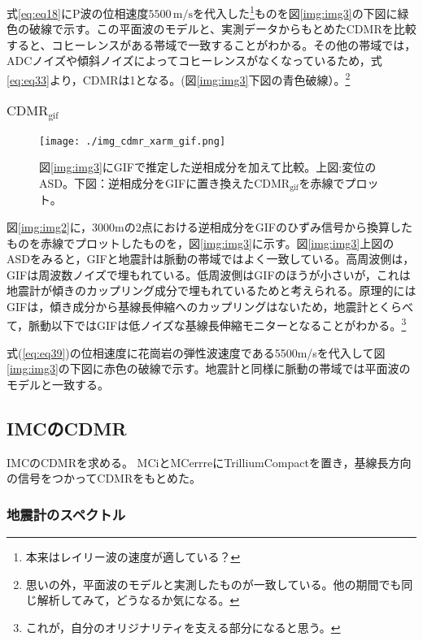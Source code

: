 式\ref{eq:eq18}にP波の位相速度$5500\, \mathrm{m/s}$を代入した\footnote[9]{本来はレイリー波の速度が適している？}ものを図\ref{img:img3}の下図に緑色の破線で示す。この平面波のモデルと、実測データからもとめたCDMRを比較すると、コヒーレンスがある帯域で一致することがわかる。その他の帯域では，ADCノイズや傾斜ノイズによってコヒーレンスがなくなっているため，式\ref{eq:eq33}より，CDMRは1となる。(図\ref{img:img3}下図の青色破線）。\footnote[10]{思いの外，平面波のモデルと実測したものが一致している。他の期間でも同じ解析してみて，どうなるか気になる。}

\subsubsection{$\mathrm{CDMR_{gif}}$}
\begin{figure}[H]
  \begin{center}
    \texttt{[image: ./img\_cdmr\_xarm\_gif.png]}
  \end{center}
  \caption{図\ref{img:img3}にGIFで推定した逆相成分を加えて比較。上図:変位のASD。下図：逆相成分をGIFに置き換えた$\mathrm{CDMR_{gif}}$を赤線でプロット。
  }\label{img:img4}
\end{figure}


図\ref{img:img2}に，3000mの2点における逆相成分をGIFのひずみ信号から換算したものを赤線でプロットしたものを，図\ref{img:img3}に示す。図\ref{img:img3}上図のASDをみると，GIFと地震計は脈動の帯域ではよく一致している。高周波側は，GIFは周波数ノイズで埋もれている。低周波側はGIFのほうが小さいが，これは地震計が傾きのカップリング成分で埋もれているためと考えられる。原理的にはGIFは，傾き成分から基線長伸縮へのカップリングはないため，地震計とくらべて，脈動以下ではGIFは低ノイズな基線長伸縮モニターとなることがわかる。\footnote[11]{これが，自分のオリジナリティを支える部分になると思う。}

式(\ref{eq:eq39})の位相速度に花崗岩の弾性波速度である5500m/sを代入して図\ref{img:img3}の下図に赤色の破線で示す。地震計と同様に脈動の帯域では平面波のモデルと一致する。


\subsection{IMCのCDMR}
IMCのCDMRを求める。%
MCiとMCerrreにTrilliumCompactを置き，基線長方向の信号をつかってCDMRをもとめた。


\subsubsection{地震計のスペクトル}

